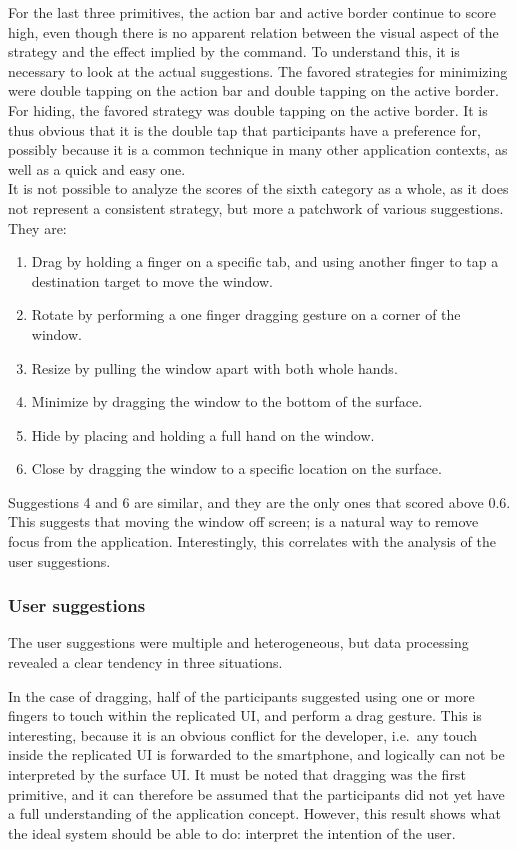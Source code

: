For the last three primitives, the action bar and active border continue to score high, even though there is no apparent relation between the visual aspect of the strategy and the effect implied by the command.
To understand this, it is necessary to look at the actual suggestions.
The favored strategies for minimizing were double tapping on the action bar and double tapping on the active border.
For hiding, the favored strategy was double tapping on the active border.
It is thus obvious that it is the double tap that participants have a preference for, possibly because it is a common technique in many other application contexts, as well as a quick and easy one.
\\
\linebreak
\label{other} It is not possible to analyze the scores of the sixth category as a whole, as it does not represent a consistent strategy, but more a patchwork of various suggestions. They are:
\begin{enumerate}
\item Drag by holding a finger on a specific tab, and using another finger to tap a destination target to move the window.
\item Rotate by performing a one finger dragging gesture on a corner of the window.
\item Resize by pulling the window apart with both whole hands.
\item Minimize by dragging the window to the bottom of the surface.
\item Hide by placing and holding a full hand on the window.
\item Close by dragging the window to a specific location on the surface.
\end{enumerate}
Suggestions 4 and 6 are similar, and they are the only ones that scored above 0.6.
This suggests that moving the window off screen; is a natural way to remove focus from the application.
Interestingly, this correlates with the analysis of the user suggestions.

\subsubsection{User suggestions}

The user suggestions were multiple and heterogeneous, but data processing revealed a clear tendency in three situations.

In the case of dragging, half of the participants suggested using one or more fingers to touch within the replicated UI, and perform a drag gesture.
This is interesting, because it is an obvious conflict for the developer, i.e.\ any touch inside the replicated UI is forwarded to the smartphone, and logically can not be interpreted by the surface UI.
It must be noted that dragging was the first primitive, and it can therefore be assumed that the participants did not yet have a full understanding of the application concept.
However, this result shows what the ideal system should be able to do: interpret the intention of the user.

